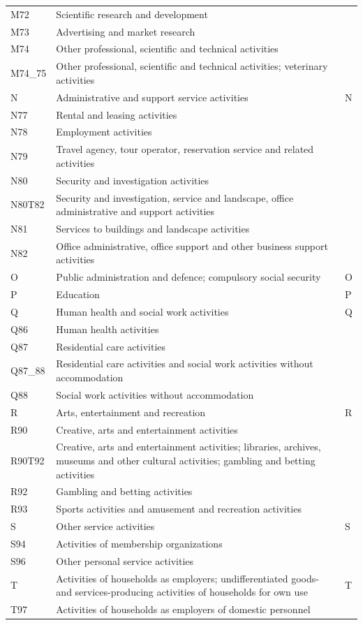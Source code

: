 \documentclass{article}
\begin{document}
\begin{tabularx}{\textwidth}{l X l}
M72     & Scientific research and development &  \\
M73     & Advertising and market research &  \\
M74     & Other professional, scientific and technical activities &  \\
M74\_75 & Other professional, scientific and technical activities; veterinary activities &  \\
N       & Administrative and support service activities & N \\
N77     & Rental and leasing activities &  \\
N78     & Employment activities &  \\
N79     & Travel agency, tour operator, reservation service and related activities &  \\
N80     & Security and investigation activities &  \\
N80T82  & Security and investigation, service and landscape, office administrative and support activities &  \\
N81     & Services to buildings and landscape activities &  \\
N82     & Office administrative, office support and other business support activities &  \\
O       & Public administration and defence; compulsory social security & O \\
P       & Education & P \\
Q       & Human health and social work activities & Q \\
Q86     & Human health activities &  \\
Q87     & Residential care activities &  \\
Q87\_88 & Residential care activities and social work activities without accommodation &  \\
Q88     & Social work activities without accommodation &  \\
R       & Arts, entertainment and recreation & R \\
R90     & Creative, arts and entertainment activities &  \\
R90T92  & Creative, arts and entertainment activities; libraries, archives, museums and other cultural activities; gambling and betting activities &  \\
R92     & Gambling and betting activities &  \\
R93     & Sports activities and amusement and recreation activities &  \\
S       & Other service activities & S \\
S94     & Activities of membership organizations &  \\
S96     & Other personal service activities &  \\
T       & Activities of households as employers; undifferentiated goods- and services-producing activities of households for own use & T \\
T97     & Activities of households as employers of domestic personnel &  \\
\hline
\end{tabularx}
\end{document}
